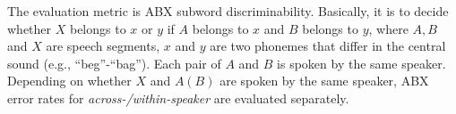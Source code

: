 \documentclass[a4paper]{article}
\begin{document}
The evaluation metric is ABX subword discriminability. Basically, it is to decide whether $X$ belongs to $x$ or $y$ if $A$ belongs to $x$ and $B$ belongs to $y$, where $A, B$ and $X$ are speech segments, $x$ and $y$ are two phonemes  that differ in the central sound (e.g., ``beg''-``bag''). Each pair of $A$ and $B$ is spoken by the same speaker. Depending on whether $X$ and $A(B)$ are spoken by the same speaker, ABX error rates for \textit{across-/within-speaker} are evaluated separately. 
\end{document}
